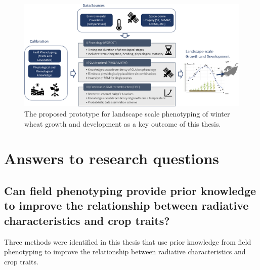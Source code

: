 \begin{figure}[H]
    \centering
    \includegraphics[width=\textwidth]{07-Discussion/img/prototype.jpg}
    \caption{The proposed prototype for landscape scale phenotyping of winter wheat growth and development as a key outcome of this thesis.}
    \label{fig:oa-disc-prototype}
\end{figure}

\section{Answers to research questions}

\subsection{Can field phenotyping provide prior knowledge to improve the relationship between radiative characteristics and crop traits?}
\label{subsec:oa-disc-aw-rq1}

Three methods were identified in this thesis that use prior knowledge from field phenotyping to improve the relationship between radiative characteristics and crop traits.

